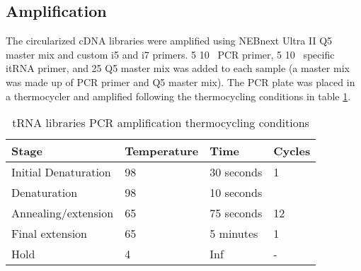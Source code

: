 \subsection{Amplification}
The circularized cDNA libraries were amplified using NEBnext Ultra II Q5 master mix and custom i5 and i7 primers.
5\ul{} 10\si{\micro\Molar} PCR primer, 5\ul{} 10\si{\micro\Molar} specific itRNA primer, and 25\ul{} Q5 master mix was added to each sample (a master mix was made up of PCR primer and Q5 master mix).
The PCR plate was placed in a thermocycler and amplified following the thermocycling conditions in table \ref{tab:my-pcr_tRNA}.

\begin{table}[]
\centering
\begin{tabular}{|l|l|l|l|}
\hline
\rowcolor[HTML]{9B9B9B}
\textbf{Stage}       & \textbf{Temperature} & \textbf{Time} & \textbf{Cycles}      \\ \hline
Initial Denaturation & 98\C{}                  & 30 seconds    & 1                    \\ \hline
Denaturation         & 98\C{}                    & 10 seconds    &                      \\ \cline{1-3}
Annealing/extension  & 65\C{}                    & 75 seconds    & \multirow{-2}{*}{12} \\ \hline
Final extension      & 65\C{}                    & 5 minutes     & 1                    \\ \hline
Hold                 & 4\C{}                     & Inf           & -                    \\ \hline
\end{tabular}
\caption[tRNA libraries PCR amplification thermocycling conditions]{tRNA libraries PCR amplification thermocycling conditions}
\label{tab:my-pcr_tRNA}
\end{table}

